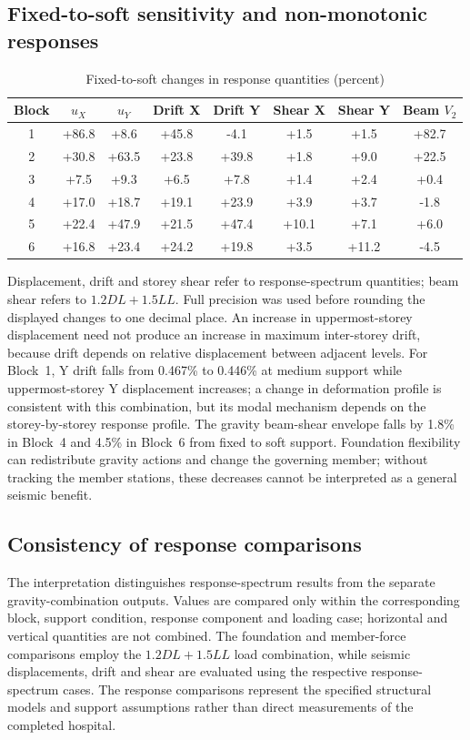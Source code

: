 \subsection*{Fixed-to-soft sensitivity and non-monotonic responses}
\begin{table}[!htbp]
\fontsize{11}{13}\selectfont\setlength{\tabcolsep}{4pt}
\centering
\fontsize{11}{13}\selectfont\setlength{\tabcolsep}{4pt}\renewcommand{\arraystretch}{0.95}
\caption{Fixed-to-soft changes in response quantities (percent)}\label{tab:seq066_fixed_soft}
\begin{tabular*}{\linewidth}{@{\extracolsep{\fill}}cccccccc@{}}
\toprule
Block & $u_X$ & $u_Y$ & Drift X & Drift Y & Shear X & Shear Y & Beam $V_2$ \\
\midrule
1 & +86.8 & +8.6 & +45.8 & -4.1 & +1.5 & +1.5 & +82.7 \\
2 & +30.8 & +63.5 & +23.8 & +39.8 & +1.8 & +9.0 & +22.5 \\
3 & +7.5 & +9.3 & +6.5 & +7.8 & +1.4 & +2.4 & +0.4 \\
4 & +17.0 & +18.7 & +19.1 & +23.9 & +3.9 & +3.7 & -1.8 \\
5 & +22.4 & +47.9 & +21.5 & +47.4 & +10.1 & +7.1 & +6.0 \\
6 & +16.8 & +23.4 & +24.2 & +19.8 & +3.5 & +11.2 & -4.5 \\
\bottomrule
\end{tabular*}
\end{table}

Displacement, drift and storey shear refer to response-spectrum quantities; beam shear refers to $1.2DL+1.5LL$. Full precision was used before rounding the displayed changes to one decimal place. An increase in uppermost-storey displacement need not produce an increase in maximum inter-storey drift, because drift depends on relative displacement between adjacent levels. For Block~1, Y drift falls from 0.467\% to 0.446\% at medium support while uppermost-storey Y displacement increases; a change in deformation profile is consistent with this combination, but its modal mechanism depends on the storey-by-storey response profile. The gravity beam-shear envelope falls by 1.8\% in Block~4 and 4.5\% in Block~6 from fixed to soft support. Foundation flexibility can redistribute gravity actions and change the governing member; without tracking the member stations, these decreases cannot be interpreted as a general seismic benefit.

\subsection*{Consistency of response comparisons}
The interpretation distinguishes response-spectrum results from the separate gravity-combination outputs. Values are compared only within the corresponding block, support condition, response component and loading case; horizontal and vertical quantities are not combined. The foundation and member-force comparisons employ the $1.2DL+1.5LL$ load combination, while seismic displacements, drift and shear are evaluated using the respective response-spectrum cases. The response comparisons represent the specified structural models and support assumptions rather than direct measurements of the completed hospital.

